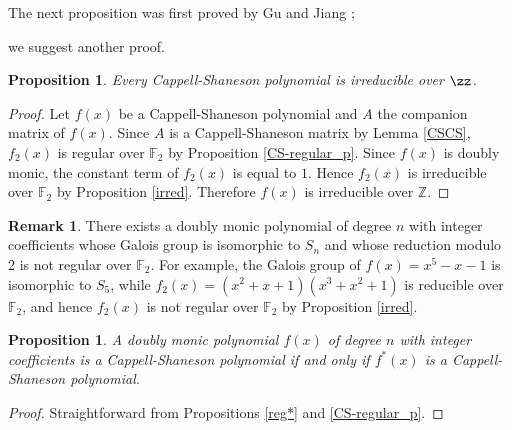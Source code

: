 \documentclass{amsart}
\theoremstyle{plain}
\newtheorem{cor}[thm]{Corollary}
\newtheorem{prop}[thm]{Proposition}
\theoremstyle{definition}
\newtheorem{rem}[thm]{Remark}
\theoremstyle{remark}
\newcommand{\cb}{}
\begin{document}


The next proposition was first proved by Gu and Jiang \cite[Theorem 3.2]{GJ1999};
{\cb
we suggest another proof.

\begin{prop}
Every Cappell-Shaneson polynomial is irreducible over $\zz$.
\end{prop}
}
\begin{proof}
Let $f(x)$ be a Cappell-Shaneson polynomial and $A$ the companion matrix of $f(x)$. 
Since $A$ is a Cappell-Shaneson matrix by Lemma \ref{CSCS}, 
$f_2(x)$ is regular over $\mathbb{F}_2$ by Proposition \ref{CS-regular_p}. 
Since $f(x)$ is doubly monic, the constant term of $f_2(x)$ is equal to $1$. 
Hence $f_2(x)$ is irreducible over $\mathbb{F}_2$ by Proposition \ref{irred}. 
Therefore $f(x)$ is irreducible over
{\cb
$\mathbb{Z}$.}
\end{proof}

\begin{rem}
There exists a doubly monic polynomial of degree $n$ with integer coefficients whose Galois group 
is isomorphic to $S_n$ and whose reduction modulo $2$ is not regular over $\mathbb{F}_2$. 
For example, the Galois group of $f(x)=x^5-x-1$ is isomorphic to $S_5$, while 
$f_2(x)=(x^2+x+1)(x^3+x^2+1)$ is reducible over $\mathbb{F}_2$, and hence $f_2(x)$ is not regular 
over $\mathbb{F}_2$ by Proposition \ref{irred}. 
\end{rem}

\begin{prop}\label{CSdual}
A doubly monic polynomial $f(x)$ of degree $n$ with integer coefficients is 
a Cappell-Shaneson polynomial if and only if $f^*(x)$ is a Cappell-Shaneson polynomial. 
\end{prop}

\begin{proof}
Straightforward from Propositions \ref{reg*} and \ref{CS-regular_p}. 
\end{proof}
\end{document}
